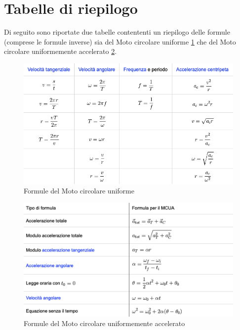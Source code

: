     \section*{Tabelle di riepilogo} Di seguito sono riportate due 
    tabelle contententi un riepilogo delle formule (comprese le formule 
    inverse) sia del Moto circolare uniforme \ref{fig:MCU} che del Moto 
    circolare uniformemente accelerato \ref{fig:MCUA}.

    \begin{figure}[H]
        \includegraphics[width=0.9\linewidth]
        {formulario/img/Formulario_MCU.png}
        \caption{Formule del Moto circolare uniforme}
        \label{fig:MCU}
    \end{figure}

    \begin{figure}[H]
        \includegraphics[width=0.9\linewidth]
        {formulario/img/Formulario_MCUA.png}
        \caption{Formule del Moto circolare uniformemente accelerato}
        \label{fig:MCUA}
    \end{figure}

